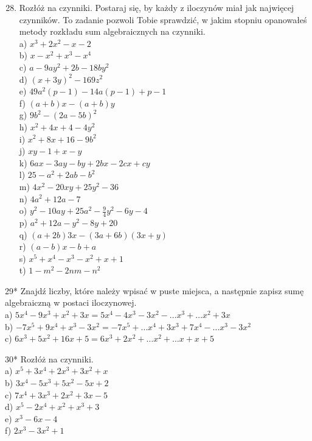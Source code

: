 \documentclass[10pt]{article}
\begin{document}
\begin{enumerate}
  \setcounter{enumi}{27}
  \item Rozłóż na czynniki. Postaraj się, by każdy z iloczynów miał jak najwięcej czynników. To zadanie pozwoli Tobie sprawdzić, w jakim stopniu opanowałeś metody rozkładu sum algebraicznych na czynniki.\\
a) \(x^{3}+2 x^{2}-x-2\)\\
b) \(x-x^{2}+x^{3}-x^{4}\)\\
c) \(a-9 a y^{2}+2 b-18 b y^{2}\)\\
d) \((x+3 y)^{2}-169 z^{2}\)\\
e) \(49 a^{2}(p-1)-14 a(p-1)+p-1\)\\
f) \((a+b) x-(a+b) y\)\\
g) \(9 b^{2}-(2 a-5 b)^{2}\)\\
h) \(x^{2}+4 x+4-4 y^{2}\)\\
i) \(x^{2}+8 x+16-9 b^{2}\)\\
j) \(x y-1+x-y\)\\
k) \(6 a x-3 a y-b y+2 b x-2 c x+c y\)\\
l) \(25-a^{2}+2 a b-b^{2}\)\\
m) \(4 x^{2}-20 x y+25 y^{2}-36\)\\
n) \(4 a^{2}+12 a-7\)\\
o) \(y^{2}-10 a y+25 a^{2}-\frac{9}{4} y^{2}-6 y-4\)\\
p) \(a^{2}+12 a-y^{2}-8 y+20\)\\
q) \((a+2 b) 3 x-(3 a+6 b)(3 x+y)\)\\
r) \((a-b) x-b+a\)\\
s) \(x^{5}+x^{4}-x^{3}-x^{2}+x+1\)\\
t) \(1-m^{2}-2 n m-n^{2}\)
\end{enumerate}

29* Znajdź liczby, które należy wpisać w puste miejsca, a następnie zapisz sumę algebraiczną w postaci iloczynowej.\\
a) \(5 x^{4}-9 x^{3}+x^{2}+3 x=5 x^{4}-4 x^{3}-3 x^{2}-\ldots x^{3}+\ldots x^{2}+3 x\)\\
b) \(-7 x^{5}+9 x^{4}+x^{3}-3 x^{2}=-7 x^{5}+\ldots x^{4}+3 x^{3}+7 x^{4}-\ldots x^{3}-3 x^{2}\)\\
c) \(6 x^{3}+5 x^{2}+16 x+5=6 x^{3}+2 x^{2}+\ldots x^{2}+\ldots x+x+5\)

30* Rozłóż na czynniki.\\
a) \(x^{5}+3 x^{4}+2 x^{3}+3 x^{2}+x\)\\
b) \(3 x^{4}-5 x^{3}+5 x^{2}-5 x+2\)\\
c) \(7 x^{4}+3 x^{3}+2 x^{2}+3 x-5\)\\
d) \(x^{5}-2 x^{4}+x^{2}+x^{3}+3\)\\
e) \(x^{3}-6 x-4\)\\
f) \(2 x^{3}-3 x^{2}+1\)
\end{document}
